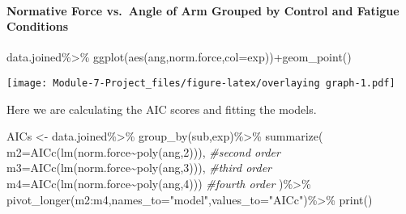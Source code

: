 \documentclass[
]{article}
\newenvironment{Shaded}{\begin{snugshade}}{\end{snugshade}}
\newcommand{\AttributeTok}[1]{\textcolor[rgb]{0.77,0.63,0.00}{#1}}
\newcommand{\CommentTok}[1]{\textcolor[rgb]{0.56,0.35,0.01}{\textit{#1}}}
\newcommand{\DecValTok}[1]{\textcolor[rgb]{0.00,0.00,0.81}{#1}}
\newcommand{\FunctionTok}[1]{\textcolor[rgb]{0.00,0.00,0.00}{#1}}
\newcommand{\NormalTok}[1]{#1}
\newcommand{\OtherTok}[1]{\textcolor[rgb]{0.56,0.35,0.01}{#1}}
\newcommand{\SpecialCharTok}[1]{\textcolor[rgb]{0.00,0.00,0.00}{#1}}
\newcommand{\StringTok}[1]{\textcolor[rgb]{0.31,0.60,0.02}{#1}}
\begin{document}
\hypertarget{normative-force-vs.-angle-of-arm-grouped-by-control-and-fatigue-conditions}{%
\paragraph{Normative Force vs.~Angle of Arm Grouped by Control and
Fatigue
Conditions}\label{normative-force-vs.-angle-of-arm-grouped-by-control-and-fatigue-conditions}}

\begin{Shaded}
\begin{Highlighting}[]
\NormalTok{data.joined}\SpecialCharTok{\%\textgreater{}\%}
  \FunctionTok{ggplot}\NormalTok{(}\FunctionTok{aes}\NormalTok{(ang,norm.force,}\AttributeTok{col=}\NormalTok{exp))}\SpecialCharTok{+}\FunctionTok{geom\_point}\NormalTok{()}
\end{Highlighting}
\end{Shaded}

\texttt{[image: Module-7-Project\_files/figure-latex/overlaying graph-1.pdf]}

Here we are calculating the AIC scores and fitting the models.

\begin{Shaded}
\begin{Highlighting}[]
\NormalTok{AICs }\OtherTok{\textless{}{-}}\NormalTok{ data.joined}\SpecialCharTok{\%\textgreater{}\%}
  \FunctionTok{group\_by}\NormalTok{(sub,exp)}\SpecialCharTok{\%\textgreater{}\%}
  \FunctionTok{summarize}\NormalTok{(}
    \AttributeTok{m2=}\FunctionTok{AICc}\NormalTok{(}\FunctionTok{lm}\NormalTok{(norm.force}\SpecialCharTok{\textasciitilde{}}\FunctionTok{poly}\NormalTok{(ang,}\DecValTok{2}\NormalTok{))), }\CommentTok{\#second order}
    \AttributeTok{m3=}\FunctionTok{AICc}\NormalTok{(}\FunctionTok{lm}\NormalTok{(norm.force}\SpecialCharTok{\textasciitilde{}}\FunctionTok{poly}\NormalTok{(ang,}\DecValTok{3}\NormalTok{))), }\CommentTok{\#third order}
    \AttributeTok{m4=}\FunctionTok{AICc}\NormalTok{(}\FunctionTok{lm}\NormalTok{(norm.force}\SpecialCharTok{\textasciitilde{}}\FunctionTok{poly}\NormalTok{(ang,}\DecValTok{4}\NormalTok{))) }\CommentTok{\#fourth order}
\NormalTok{  )}\SpecialCharTok{\%\textgreater{}\%}
  \FunctionTok{pivot\_longer}\NormalTok{(m2}\SpecialCharTok{:}\NormalTok{m4,}\AttributeTok{names\_to=}\StringTok{"model"}\NormalTok{,}\AttributeTok{values\_to=}\StringTok{"AICc"}\NormalTok{)}\SpecialCharTok{\%\textgreater{}\%}
  \FunctionTok{print}\NormalTok{()}
\end{Highlighting}
\end{Shaded}
\end{document}
